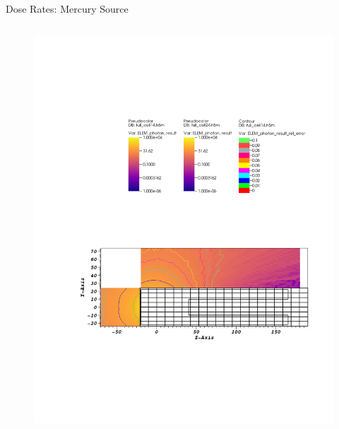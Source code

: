 \documentclass{beamer}
\begin{document}
\begin{frame}{Dose Rates: Mercury Source}
\begin{columns}[T]
        \begin{figure}
                \includegraphics[scale=0.49,trim={20cm 16cm 7cm 5cm},clip]{figs/dose_mer_cell_novoid.pdf}
        \end{figure}

\end{columns}
\end{frame}
\end{document}
